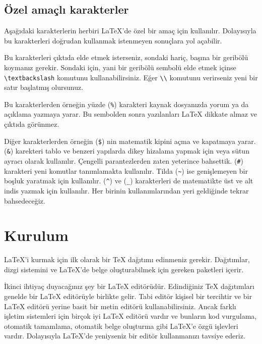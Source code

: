 \documentclass[
  10pt,
]{scrbook}
\newenvironment{Shaded}{\begin{snugshade}}{\end{snugshade}}
\newcommand{\CommentTok}[1]{\textcolor[rgb]{0.56,0.35,0.01}{\textit{#1}}}
\newcommand{\NormalTok}[1]{#1}
\newcommand{\SpecialStringTok}[1]{\textcolor[rgb]{0.31,0.60,0.02}{#1}}
\theoremstyle{definition}
\theoremstyle{definition}
\theoremstyle{definition}
\theoremstyle{definition}
\theoremstyle{remark}
\begin{document}
\hypertarget{uxf6zel-amauxe7lux131-karakterler}{%
\subsection{Özel amaçlı karakterler}\label{uxf6zel-amauxe7lux131-karakterler}}

Aşağıdaki karakterlerin herbiri LaTeX'de özel bir amaç için kullanılır. Dolayısıyla bu karakterleri doğrudan kullanmak istenmeyen sonuçlara yol açabilir.

\begin{Shaded}
\begin{Highlighting}[]
\NormalTok{\# }\SpecialStringTok{$ }\CommentTok{\%   \&   \{   \}   \textasciitilde{}  \^{}  \_ \textbackslash{}}
\end{Highlighting}
\end{Shaded}

Bu karakterleri çıktıda elde etmek isterseniz, sondaki hariç, başına bir geribölü koymanız gerekir. Sondaki için, yani bir geribölü sembolü elde etmek içinse \texttt{\textbackslash{}textbackslash} komutunu kullanabilirsiniz. Eğer \texttt{\textbackslash{}\textbackslash{}} komutunu verirseniz yeni bir satır başlatmış olursunuz.

Bu karakterlerden örneğin yüzde (\texttt{\%}) karakteri kaynak dosyanızda yorum ya da açıklama yazmaya yarar. Bu sembolden sonra yazılanları LaTeX dikkate almaz ve çıktıda görünmez.

Diğer karakterlerden örneğin (\texttt{\$}) nin matematik kipini açma ve kapatmaya yarar. (\texttt{\&}) karekteri tablo ve benzeri yapılarda dikey hizalama yapmak için veya sütun ayracı olarak kullanılır. Çengelli parantezlerden zaten yeterince bahsettik. (\texttt{\#}) karakteri yeni komutlar tanımlamakta kullanılır. Tilda (\texttt{\textasciitilde{}}) ise genişlemeyen bir boşluk yaratmak için kullanılır. (\texttt{\^{}}) ve (\texttt{\_}) karakterleri de matematikte üst ve alt indis yazmak için kullanılır. Her birinin kullanımlarından yeri geldiğinde tekrar bahsedeceğiz.

\hypertarget{kurulum}{%
\section{Kurulum}\label{kurulum}}

LaTeX'i kurmak için ilk olarak bir TeX dağıtımı edinmeniz gerekir. Dağıtımlar, dizgi sistemini ve LaTeX'de belge oluşturabilmek için gereken paketleri içerir.

İkinci ihtiyaç duyacağınız şey bir LaTeX editörüdür. Edindiğiniz TeX dağıtımları genelde bir LaTeX editörüyle birlikte gelir. Tabi editör kişisel bir tercihtir ve bir LaTeX editörü yerine basit bir metin editörü kullanabilirsiniz. Ancak farklı işletim sistemleri için birçok iyi LaTeX editörü vardır ve bunların kod vurgulama, otomatik tamamlama, otomatik belge oluşturma gibi LaTeX'e özgü işlevleri vardır. Dolayısıyla LaTeX'de yeniyseniz bir editör kullanmanızı tavsiye ederiz.
\end{document}
